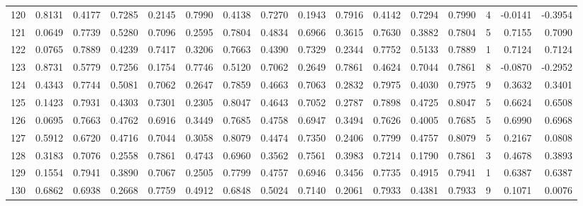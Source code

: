 \begin{tabular}{lrrrrrrrrrrrrrrr}
120 &      0.8131 &  0.4177 &  0.7285 &  0.2145 &  0.7990 &  0.4138 &  0.7270 &  0.1943 &  0.7916 &  0.4142 &   0.7294 &     0.7990 &      4 &                   -0.0141 &                    -0.3954 \\
121 &      0.0649 &  0.7739 &  0.5280 &  0.7096 &  0.2595 &  0.7804 &  0.4834 &  0.6966 &  0.3615 &  0.7630 &   0.3882 &     0.7804 &      5 &                    0.7155 &                     0.7090 \\
122 &      0.0765 &  0.7889 &  0.4239 &  0.7417 &  0.3206 &  0.7663 &  0.4390 &  0.7329 &  0.2344 &  0.7752 &   0.5133 &     0.7889 &      1 &                    0.7124 &                     0.7124 \\
123 &      0.8731 &  0.5779 &  0.7256 &  0.1754 &  0.7746 &  0.5120 &  0.7062 &  0.2649 &  0.7861 &  0.4624 &   0.7044 &     0.7861 &      8 &                   -0.0870 &                    -0.2952 \\
124 &      0.4343 &  0.7744 &  0.5081 &  0.7062 &  0.2647 &  0.7859 &  0.4663 &  0.7063 &  0.2832 &  0.7975 &   0.4030 &     0.7975 &      9 &                    0.3632 &                     0.3401 \\
125 &      0.1423 &  0.7931 &  0.4303 &  0.7301 &  0.2305 &  0.8047 &  0.4643 &  0.7052 &  0.2787 &  0.7898 &   0.4725 &     0.8047 &      5 &                    0.6624 &                     0.6508 \\
126 &      0.0695 &  0.7663 &  0.4762 &  0.6916 &  0.3449 &  0.7685 &  0.4758 &  0.6947 &  0.3494 &  0.7626 &   0.4005 &     0.7685 &      5 &                    0.6990 &                     0.6968 \\
127 &      0.5912 &  0.6720 &  0.4716 &  0.7044 &  0.3058 &  0.8079 &  0.4474 &  0.7350 &  0.2406 &  0.7799 &   0.4757 &     0.8079 &      5 &                    0.2167 &                     0.0808 \\
128 &      0.3183 &  0.7076 &  0.2558 &  0.7861 &  0.4743 &  0.6960 &  0.3562 &  0.7561 &  0.3983 &  0.7214 &   0.1790 &     0.7861 &      3 &                    0.4678 &                     0.3893 \\
129 &      0.1554 &  0.7941 &  0.3890 &  0.7067 &  0.2505 &  0.7799 &  0.4757 &  0.6946 &  0.3456 &  0.7735 &   0.4915 &     0.7941 &      1 &                    0.6387 &                     0.6387 \\
130 &      0.6862 &  0.6938 &  0.2668 &  0.7759 &  0.4912 &  0.6848 &  0.5024 &  0.7140 &  0.2061 &  0.7933 &   0.4381 &     0.7933 &      9 &                    0.1071 &                     0.0076 \\

\end{tabular}
